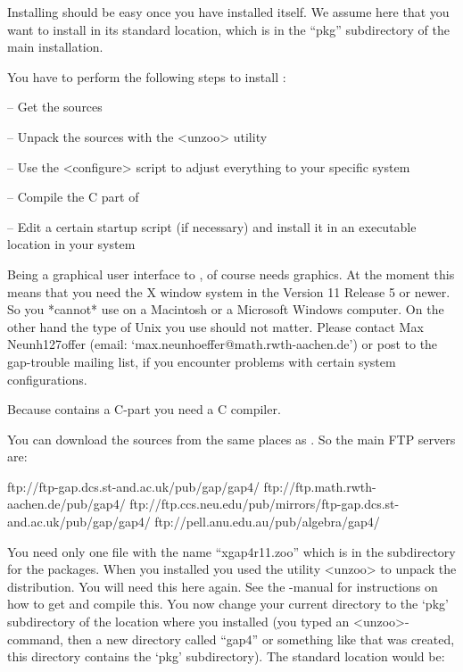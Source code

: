 
Installing {\XGAP} should be easy once you have installed {\GAP} itself. We
assume here that you want to install {\XGAP} in its standard location,
which is in the ``pkg'' subdirectory of the main {} installation.


You have to perform the following steps to install {\XGAP}:

\beginlist
\item{--} Get the sources
\item{--} Unpack the sources with the <unzoo> utility
\item{--} Use the <configure> script to adjust everything to your specific
  system
\item{--} Compile the C part of {\XGAP}
\item{--} Edit a certain startup script (if necessary) and install it in 
      an executable location in your system
\endlist


Being a graphical user interface to {\GAP}, {\XGAP} of course needs
graphics. At the moment this means that you need the X window system in the 
Version 11 Release 5 or newer. So you *cannot* use {\XGAP} on a Macintosh
or a Microsoft Windows computer. On the other hand the type of Unix you use 
should not matter. Please contact Max Neunh\accent127offer (email:
`max.neunhoeffer@math.rwth-aachen.de') or post to the gap-trouble  
mailing list, if you encounter problems with certain system configurations.

Because {\XGAP} contains a C-part you need a C compiler.


You can download the sources from the same places as {\GAP}. So the main
FTP servers are:

\begintt
ftp://ftp-gap.dcs.st-and.ac.uk/pub/gap/gap4/
ftp://ftp.math.rwth-aachen.de/pub/gap4/
ftp://ftp.ccs.neu.edu/pub/mirrors/ftp-gap.dcs.st-and.ac.uk/pub/gap/gap4/
ftp://pell.anu.edu.au/pub/algebra/gap4/
\endtt

You need only one file with the name ``xgap4r11.zoo''
which is in the subdirectory for the packages.
When you installed {\GAP} you used the utility <unzoo> to unpack the
distribution. You will need this here again. See the {\GAP}-manual for
instructions on how to get and compile this.
You now change your current directory to the `pkg' subdirectory of the 
location where you installed
{\GAP} (you typed an <unzoo>-command, then a new directory called
``gap4'' or something like that was created, this directory contains
the `pkg' subdirectory). The standard location would be:

